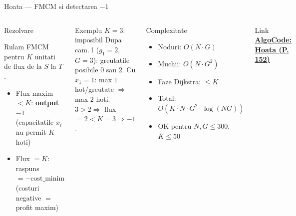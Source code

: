 ﻿\documentclass[9pt]{beamer}
\begin{document}
\begin{frame}{Hoata --- FMCM si detectarea $-1$}
  \begin{columns}[T]
    \begin{block}{Rezolvare}
      \begin{footnotesize}
      Rulam FMCM pentru $K$ unitati de flux de la $S$ la $T$.
      \begin{itemize}\itemsep0pt
        \item Flux maxim $< K$: \textbf{output $-1$}\\
              (capacitatile $x_i$ nu permit $K$ hoti)
        \item Flux $= K$: raspuns $= -\text{cost\_minim}$\\
              (costuri negative $=$ profit maxim)
      \end{itemize}
      \end{footnotesize}
    \end{block}
    \smallskip
    \begin{exampleblock}{Exemplu $K=3$: imposibil}
      \footnotesize
      Dupa cam.\,1 ($g_1=2$, $G=3$): greutatile posibile $0$ sau $2$.
      Cu $x_1=1$: max $1$ hot/greutate $\Rightarrow$ max $2$ hoti.
      $3>2 \Rightarrow$ flux $= 2 < K=3 \Rightarrow -1$.
    \end{exampleblock}
    \begin{alertblock}{Complexitate}
      \begin{footnotesize}
      \begin{itemize}\itemsep0pt
        \item Noduri: $O(N\!\cdot\! G)$
        \item Muchii: $O(N\!\cdot\! G^2)$
        \item Faze Dijkstra: $\leq K$
        \item Total: $O(K\!\cdot\! N\!\cdot\! G^2\!\cdot\!\log(NG))$
        \item OK pentru $N,G\leq 300$, $K\leq 50$
      \end{itemize}
      \end{footnotesize}
    \end{alertblock}
    \begin{block}{Link}
      \footnotesize
      \href{https://code.algolymp.com/problems/152}{\textbf{AlgoCode: Hoata (P. 152)}}
    \end{block}
  \end{columns}
\end{frame}
\end{document}
